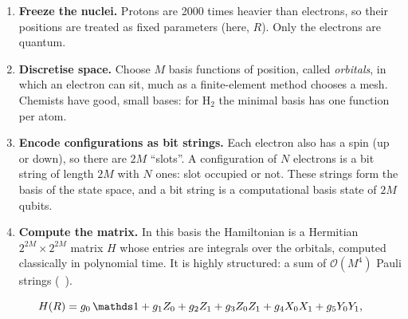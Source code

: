 \documentclass[handoutsbeamer.tex]{subfiles}
\begin{document}
\begin{frame}
\onp{\scriptsize}
\begin{enumerate}\setlength\itemsep{0.25em}
    \item \textbf{Freeze the nuclei.} Protons are 2000 times heavier than electrons, so their positions are treated as fixed parameters (here, $R$). Only the electrons are quantum.
    \item \textbf{Discretise space.} Choose $M$ basis functions of position, called \emph{orbitals}, in which an electron can sit, much as a finite-element method chooses a mesh. Chemists have good, small bases: for H$_2$ the minimal basis has one function per atom.
    \item \textbf{Encode configurations as bit strings.} Each electron also has a spin (up or down), so there are $2M$ ``slots''. A configuration of $N$ electrons is a bit string of length $2M$ with $N$ ones: slot occupied or not. These strings form the basis of the state space, and a bit string is a computational basis state of $2M$ qubits.
    \item \textbf{Compute the matrix.} In this basis the Hamiltonian is a Hermitian $2^{2M}\times2^{2M}$ matrix $H$ whose entries are integrals over the orbitals, computed classically in polynomial time. It is highly structured: a sum of $\mathcal O(M^4)$ Pauli strings (\Chap~).
\end{enumerate}
\begin{equation}\label{eq:ch01:h2qubit}
    H(R) = g_0\,\one + g_1 Z_0 + g_2 Z_1 + g_3 Z_0Z_1 + g_4 X_0X_1 + g_5 Y_0Y_1,
\end{equation}
\end{frame}
\end{document}
